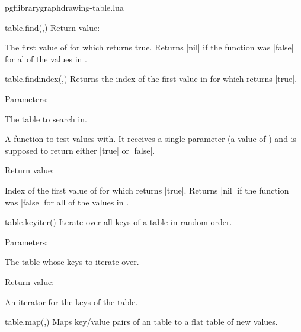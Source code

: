 \begin{filedescription}{pgflibrarygraphdrawing-table.lua}
\begin{luacommand}{{table.find}(,)}
Return value:
\begin{parameterdescription} 
  \item[] The first value of  for which  returns true. Returns |nil| if the function was |false| for al of the values in . 
\end{parameterdescription}


\end{luacommand}
\begin{luacommand}{{table.find\textunderscore{}index}(,)}
Returns the index of the first value in  for which  returns |true|. 

Parameters:
\begin{parameterdescription}
	\item[\meta{table}] The table to search in.\item[\meta{find\_func}] A function to test values with. It receives a single parameter (a value of ) and is supposed to return either |true| or |false|. 
\end{parameterdescription}


Return value:
\begin{parameterdescription} 
  \item[] Index of the first value of  for which  returns |true|. Returns |nil| if the function was |false| for all of the values in . 
\end{parameterdescription}


\end{luacommand}
\begin{luacommand}{{table.key\textunderscore{}iter}()}
Iterate over all keys of a table in random order. 

Parameters:
\begin{parameterdescription}
	\item[\meta{table}] The table whose keys to iterate over. 
\end{parameterdescription}


Return value:
\begin{parameterdescription} 
  \item[] An iterator for the keys of the table. 
\end{parameterdescription}


\end{luacommand}
\begin{luacommand}{{table.map}(,)}
Maps key/value pairs of an  table to a flat table of new values. 


\end{luacommand}
\end{filedescription}
